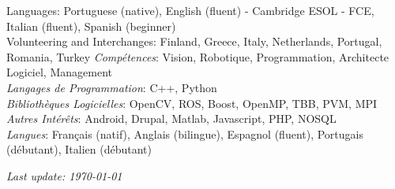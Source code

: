 \documentclass{article}
\begin{document}
\begin{llist}
{Languages: Portuguese (native), English (fluent) - Cambridge ESOL - FCE, Italian (fluent), Spanish (beginner)\\
Volunteering and Interchanges: Finland, Greece, Italy, Netherlands, Portugal, Romania, Turkey
}
{
{\em Comp\'{e}tences}: Vision, Robotique, Programmation, Architecte Logiciel, Management\\
{\em Langages de Programmation}: C++, Python\\
{\em Biblioth\`{e}ques Logicielles}: OpenCV, ROS, Boost, OpenMP, TBB, PVM, MPI \\
{\em Autres Int\'{e}r\^{e}ts}: Android, Drupal, Matlab, Javascript, PHP, NOSQL \\
{\em Langues}: Fran\c{c}ais (natif), Anglais (bilingue), Espagnol (fluent), Portugais (d\'{e}butant), Italien
(d\'{e}butant)
}




\end{llist}

{\em Last update: \today}
\end{document}
